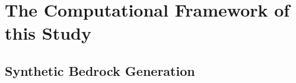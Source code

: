 \section{The Computational Framework of this Study}


\subsection{Synthetic Bedrock Generation}




